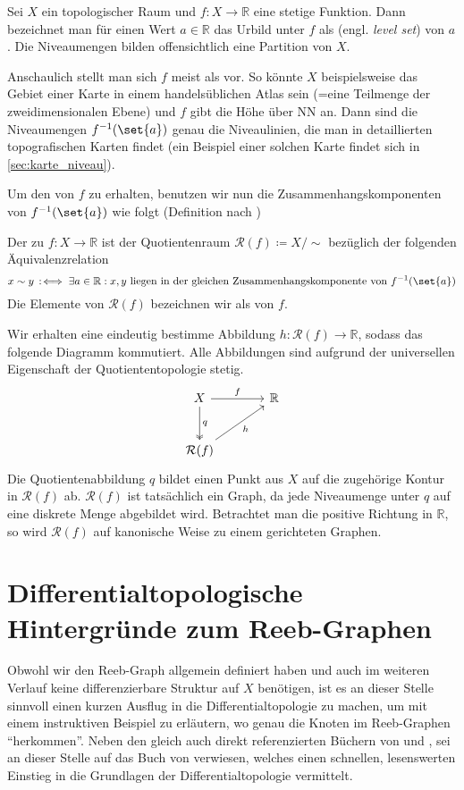 Sei $X$ ein topologischer Raum und $f \colon X \to \mathbb{R}$ eine stetige Funktion.
Dann bezeichnet man für einen Wert $a \in \mathbb{R}$ das Urbild unter $f$ als  (engl. \emph{level set}) von $a$.
Die Niveaumengen bilden offensichtlich eine Partition von $X$.

Anschaulich stellt man sich $f$ meist als  vor. 
So könnte $X$ beispielsweise das Gebiet einer Karte in einem handelsüblichen Atlas sein (=eine Teilmenge der zweidimensionalen Ebene) und $f$ gibt die Höhe über NN an.
Dann sind die Niveaumengen $f^{-1}(\set{a})$ genau die Niveaulinien, die man in detaillierten topografischen Karten findet (ein Beispiel einer solchen Karte findet sich in \cref{sec:karte_niveau}).

Um den  von $f$ zu erhalten, benutzen wir nun die Zusammenhangskomponenten von $f^{-1}(\set{a})$ wie folgt (Definition nach \textcite[.4]{compTopo})

\begin{definition}[{name=[Reeb-Graph]}]
	Der  zu $f \colon X \to \mathbb{R}$ ist der Quotientenraum $\mathcal{R}(f) \coloneqq X/{\sim}$ bezüglich der folgenden Äquivalenzrelation
	\[
		x \sim y \,:\mkern-3mu\iff \exists a \in \mathbb{R} : x,y \text{ liegen in der gleichen Zusammenhangskomponente von } f^{-1}(\set{a}) 
	\]
	Die Elemente von $\mathcal{R}(f)$ bezeichnen wir als  von $f$.
\end{definition}
Wir erhalten eine eindeutig bestimme Abbildung $h \colon \mathcal{R}(f) \to \mathbb{R}$, sodass das folgende Diagramm kommutiert.
Alle Abbildungen sind aufgrund der universellen Eigenschaft der Quotiententopologie stetig.
\[
	\begin{tikzcd}[sep=large]
		X \rar["f"] \dar["q",two heads] & \mathbb{R} \\
		\mathcal{R}(f) \urar["h"']
	\end{tikzcd}
\]
Die Quotientenabbildung $q$ bildet einen Punkt aus $X$ auf die zugehörige Kontur in $\mathcal{R}(f)$ ab.
$\mathcal{R}(f)$ ist tatsächlich ein Graph, da jede Niveaumenge unter $q$ auf eine diskrete Menge abgebildet wird.
Betrachtet man die positive Richtung in $\mathbb{R}$, so wird $\mathcal{R}(f)$ auf kanonische Weise zu einem gerichteten Graphen.

\section{Differentialtopologische Hintergründe zum Reeb-Graphen} %
\label{sec:background_reeb}
Obwohl wir den Reeb-Graph allgemein definiert haben und auch im weiteren Verlauf keine differenzierbare Struktur auf $X$ benötigen, ist es an dieser Stelle sinnvoll einen kurzen Ausflug in die Differentialtopologie zu machen, um mit einem instruktiven Beispiel zu erläutern, wo genau die Knoten im Reeb-Graphen \enquote{herkommen}.
Neben den gleich auch direkt referenzierten Büchern von \textcite{compTopo} und \textcite{MilnorMorse}, sei an dieser Stelle auf das Buch  von \textcite{Miln} verwiesen, welches einen schnellen, lesenswerten Einstieg in die Grundlagen der Differentialtopologie vermittelt.

